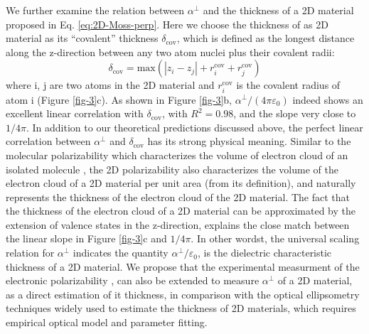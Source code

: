 \documentclass[journal=ancac3,manuscript=article,email=true,hyperref=true,keywords=false]{achemso}
\begin{document}
We further examine the relation between $\alpha^{\perp}$ and the
thickness of a 2D material proposed in Eq. \ref{eq:2D-Moss-perp}. Here
we choose the thickness of as 2D material as its ``covalent''
thickness $\delta_{\mathrm{cov}}$, which is
defined as the longest distance along the z-direction between any two
atom nuclei plus their covalent radii:
\begin{equation}
  \label{eq:cov-thick}
  \delta_{\mathrm{cov}} = \mathrm{max}(|z_{i} - z_{j}|
  + r_{i}^{\mathrm{cov}} + r_{j}^{\mathrm{cov}})
\end{equation}
where i, j are two atoms in the 2D material and $r^{\mathrm{cov}}_{i}$
is the covalent radius of atom i (Figure \ref{fig-3}c). As shown in
Figure \ref{fig-3}b, $\alpha^{\perp}/(4 \pi \varepsilon_{0})$ indeed
shows an excellent linear correlation with $\delta_{\mathrm{cov}}$,
with $R^{2}=0.98$, and the slope very close to $1/4\pi$. In addition
to our theoretical predictions discussed above, the perfect linear
correlation between $\alpha^{\perp}$ and $\delta_{\mathrm{cov}}$ has
its strong physical meaning. Similar to the molecular polarizability
which characterizes the volume of electron cloud of an isolated
molecule \cite{Israelachvili_2011}, the 2D polarizability also
characterizes the volume of the electron cloud of a 2D material per
unit area (from its definition), and naturally represents the
thickness of the electron cloud of the 2D material. The fact that the
thickness of the electron cloud of a 2D material can be approximated
by the extension of valence states in the z-direction, explains the
close match between the linear slope in Figure \ref{fig-3}c and
$1/4\pi$. In other wordst, the universal scaling relation for
$\alpha^{\perp}$ indicates the quantity
$\alpha^{\perp}/\varepsilon_{0}$, is the dielectric characteristic
thickness of a 2D material. We propose that the experimental
measurment of the electronic polarizability
\cite{Antoine_1999,Cherniavskaya_2003,Krauss_1999_EFM}, can also be
extended to measure $\alpha^{\perp}$ of a 2D material, as a direct
estimation of it thickness, in comparison with the optical
ellipsometry techniques \cite{Weber_2010} widely used to estimate the
thickness of 2D materials, which requires empirical optical model and
parameter fitting.
\end{document}
